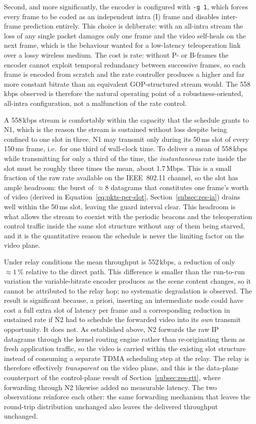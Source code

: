 Second, and more significantly, the encoder is configured with \texttt{-g~1},
which forces every frame to be coded as an independent intra (I) frame and
disables inter-frame prediction entirely. This choice is deliberate: with an
all-intra stream the loss of any single packet damages only one frame and the
video self-heals on the next frame, which is the behaviour wanted for a
low-latency teleoperation link over a lossy wireless medium. The cost is rate:
without P- or B-frames the encoder cannot exploit temporal redundancy between
successive frames, so each frame is encoded from scratch and the rate
controller produces a higher and far more constant bitrate than an equivalent
GOP-structured stream would. The 558\,kbps observed is therefore the natural
operating point of a robustness-oriented, all-intra configuration, not a
malfunction of the rate control.

A 558\,kbps stream is comfortably within the capacity that the schedule grants
to N1, which is the reason the stream is sustained without loss despite being
confined to one slot in three. N1 may transmit only during its 50\,ms slot of
every 150\,ms frame, i.e.\ for one third of wall-clock time. To deliver a
mean of 558\,kbps while transmitting for only a third of the time, the
\emph{instantaneous} rate inside the slot must be roughly three times the mean,
about 1.7\,Mbps. This is a small fraction of the raw rate available on the
IEEE~802.11 channel, so the slot has ample headroom: the burst of $\approx 8$
datagrams that constitutes one frame's worth of video (derived in
Equation~\ref{eq:pkts-per-slot}, Section~\ref{subsec:res-ia}) drains well
within the 50\,ms slot, leaving the guard interval clear. This headroom is what
allows the stream to coexist with the periodic beacons and the teleoperation
control traffic inside the same slot structure without any of them being
starved, and it is the quantitative reason the schedule is never the limiting
factor on the video plane.

Under relay conditions the mean throughput is 552\,kbps, a reduction of only
$\approx 1\,\%$ relative to the direct path. This difference is smaller than
the run-to-run variation the variable-bitrate encoder produces as the scene
content changes, so it cannot be attributed to the relay hop; no systematic
degradation is observed. The result is significant because, a priori, inserting
an intermediate node could have cost a full extra slot of latency per frame and
a corresponding reduction in sustained rate if N2 had to schedule the forwarded
video into its \emph{own} transmit opportunity. It does not. As established
above, N2 forwards the raw IP datagrams through the kernel routing engine
rather than re-originating them as fresh application traffic, so the video is
carried within the existing slot structure instead of consuming a separate
TDMA scheduling step at the relay. The relay is therefore effectively
\emph{transparent} on the video plane, and this is the data-plane counterpart
of the control-plane result of Section~\ref{subsec:res-rtt}, where forwarding
through N2 likewise added no measurable latency. The two observations reinforce
each other: the same forwarding mechanism that leaves the round-trip
distribution unchanged also leaves the delivered throughput unchanged.

